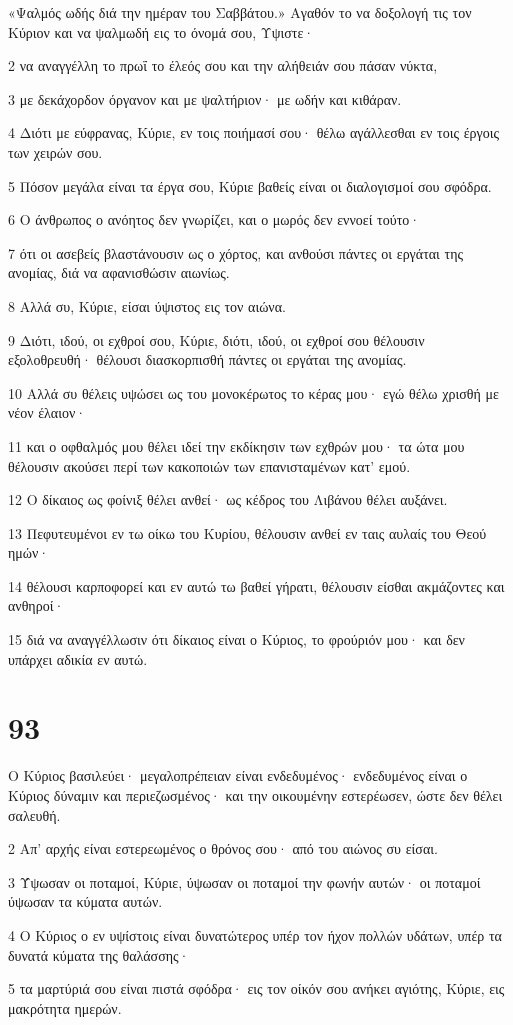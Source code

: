 \par «Ψαλμός ωδής διά την ημέραν του Σαββάτου.» Αγαθόν το να δοξολογή τις τον Κύριον και να ψαλμωδή εις το όνομά σου, Υψιστε·
\par 2 να αναγγέλλη το πρωΐ το έλεός σου και την αλήθειάν σου πάσαν νύκτα,
\par 3 με δεκάχορδον όργανον και με ψαλτήριον· με ωδήν και κιθάραν.
\par 4 Διότι με εύφρανας, Κύριε, εν τοις ποιήμασί σου· θέλω αγάλλεσθαι εν τοις έργοις των χειρών σου.
\par 5 Πόσον μεγάλα είναι τα έργα σου, Κύριε βαθείς είναι οι διαλογισμοί σου σφόδρα.
\par 6 Ο άνθρωπος ο ανόητος δεν γνωρίζει, και ο μωρός δεν εννοεί τούτο·
\par 7 ότι οι ασεβείς βλαστάνουσιν ως ο χόρτος, και ανθούσι πάντες οι εργάται της ανομίας, διά να αφανισθώσιν αιωνίως.
\par 8 Αλλά συ, Κύριε, είσαι ύψιστος εις τον αιώνα.
\par 9 Διότι, ιδού, οι εχθροί σου, Κύριε, διότι, ιδού, οι εχθροί σου θέλουσιν εξολοθρευθή· θέλουσι διασκορπισθή πάντες οι εργάται της ανομίας.
\par 10 Αλλά συ θέλεις υψώσει ως του μονοκέρωτος το κέρας μου· εγώ θέλω χρισθή με νέον έλαιον·
\par 11 και ο οφθαλμός μου θέλει ιδεί την εκδίκησιν των εχθρών μου· τα ώτα μου θέλουσιν ακούσει περί των κακοποιών των επανισταμένων κατ' εμού.
\par 12 Ο δίκαιος ως φοίνιξ θέλει ανθεί· ως κέδρος του Λιβάνου θέλει αυξάνει.
\par 13 Πεφυτευμένοι εν τω οίκω του Κυρίου, θέλουσιν ανθεί εν ταις αυλαίς του Θεού ημών·
\par 14 θέλουσι καρποφορεί και εν αυτώ τω βαθεί γήρατι, θέλουσιν είσθαι ακμάζοντες και ανθηροί·
\par 15 διά να αναγγέλλωσιν ότι δίκαιος είναι ο Κύριος, το φρούριόν μου· και δεν υπάρχει αδικία εν αυτώ.

\chapter{93}

\par Ο Κύριος βασιλεύει· μεγαλοπρέπειαν είναι ενδεδυμένος· ενδεδυμένος είναι ο Κύριος δύναμιν και περιεζωσμένος· και την οικουμένην εστερέωσεν, ώστε δεν θέλει σαλευθή.
\par 2 Απ' αρχής είναι εστερεωμένος ο θρόνος σου· από του αιώνος συ είσαι.
\par 3 Ύψωσαν οι ποταμοί, Κύριε, ύψωσαν οι ποταμοί την φωνήν αυτών· οι ποταμοί ύψωσαν τα κύματα αυτών.
\par 4 Ο Κύριος ο εν υψίστοις είναι δυνατώτερος υπέρ τον ήχον πολλών υδάτων, υπέρ τα δυνατά κύματα της θαλάσσης·
\par 5 τα μαρτύριά σου είναι πιστά σφόδρα· εις τον οίκόν σου ανήκει αγιότης, Κύριε, εις μακρότητα ημερών.

